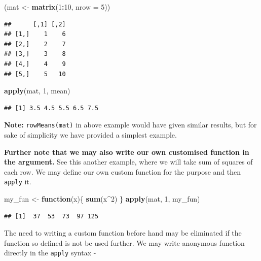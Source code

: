 \documentclass[
]{book}
\newenvironment{Shaded}{\begin{snugshade}}{\end{snugshade}}
\newcommand{\AttributeTok}[1]{\textcolor[rgb]{0.13,0.29,0.53}{#1}}
\newcommand{\ControlFlowTok}[1]{\textcolor[rgb]{0.13,0.29,0.53}{\textbf{#1}}}
\newcommand{\DecValTok}[1]{\textcolor[rgb]{0.00,0.00,0.81}{#1}}
\newcommand{\FunctionTok}[1]{\textcolor[rgb]{0.13,0.29,0.53}{\textbf{#1}}}
\newcommand{\NormalTok}[1]{#1}
\newcommand{\OtherTok}[1]{\textcolor[rgb]{0.56,0.35,0.01}{#1}}
\newcommand{\SpecialCharTok}[1]{\textcolor[rgb]{0.81,0.36,0.00}{\textbf{#1}}}
\begin{document}
\begin{Shaded}
\begin{Highlighting}[]
\NormalTok{(mat }\OtherTok{\textless{}{-}} \FunctionTok{matrix}\NormalTok{(}\DecValTok{1}\SpecialCharTok{:}\DecValTok{10}\NormalTok{, }\AttributeTok{nrow =} \DecValTok{5}\NormalTok{))}
\end{Highlighting}
\end{Shaded}

\begin{verbatim}
##      [,1] [,2]
## [1,]    1    6
## [2,]    2    7
## [3,]    3    8
## [4,]    4    9
## [5,]    5   10
\end{verbatim}

\begin{Shaded}
\begin{Highlighting}[]
\FunctionTok{apply}\NormalTok{(mat, }\DecValTok{1}\NormalTok{, mean)}
\end{Highlighting}
\end{Shaded}

\begin{verbatim}
## [1] 3.5 4.5 5.5 6.5 7.5
\end{verbatim}

\textbf{Note:} \texttt{rowMeans(mat)} in above example would have given similar results, but for sake of simplicity we have provided a simplest example.

\textbf{Further note that we may also write our own customised function in the argument.} See this another example, where we will take sum of squares of each row. We may define our own custom function for the purpose and then \texttt{apply} it.

\begin{Shaded}
\begin{Highlighting}[]
\NormalTok{my\_fun }\OtherTok{\textless{}{-}} \ControlFlowTok{function}\NormalTok{(x)\{}
  \FunctionTok{sum}\NormalTok{(x}\SpecialCharTok{\^{}}\DecValTok{2}\NormalTok{)}
\NormalTok{\}}
\FunctionTok{apply}\NormalTok{(mat, }\DecValTok{1}\NormalTok{, my\_fun)}
\end{Highlighting}
\end{Shaded}

\begin{verbatim}
## [1]  37  53  73  97 125
\end{verbatim}

The need to writing a custom function before hand may be eliminated if the function so defined is not be used further. We may write anonymous function directly in the \texttt{apply} syntax -
\end{document}
